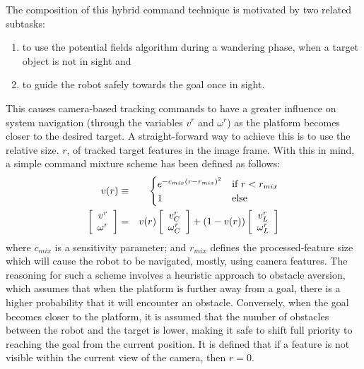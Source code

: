 			The composition of this hybrid command technique is motivated by two related subtasks: 
				\begin{enumerate}
				\item to use the potential fields algorithm during a wandering phase, when a target object is not in sight and
				\item to guide the robot safely towards the goal once in sight.
				\end{enumerate}
			This causes camera-based tracking commands to have a greater influence on system navigation (through the variables $v^{r}$ and $\omega^{r}$) as the platform becomes closer to the desired target. A straight-forward way to achieve this is to use the relative size. $r$, of tracked target features in the image frame. With this in mind, a simple command mixture scheme has been defined as follows:
			\begin{eqnarray}
				v(r) &\equiv&
				\begin{cases}
				e^{ -c_{mix} \left( r - r_{mix}\right)^{2} } 	& \text{if } r < r_{mix}	\\
				1											& \text{else}
				\end{cases}
								\nonumber \\
						\left[\begin{array}{c} v^{r} 	\\ \omega^{r} 		\end{array} \right] &=& 	
				v(r)	\left[\begin{array}{c} v^{r}_{C}\\ \omega^{r}_{C} 	\end{array} \right] + 
				(1-v(r))\left[\begin{array}{c} v^{r}_{L}\\ \omega^{r}_{L} 	\end{array} \right] 
			\end{eqnarray}
			where $c_{mix}$ is a sensitivity parameter; and $r_{mix}$ defines the processed-feature size which will cause the robot to be navigated, mostly, using camera features. The reasoning for such a scheme involves a heuristic approach to obstacle aversion, which assumes that when the platform is further away from a goal, there is a higher probability that it will encounter an obstacle. Conversely, when the goal becomes closer to the platform, it is assumed that the number of obstacles between the robot and the target is lower, making it safe to shift full priority to reaching the goal from the current position. It is defined that if a feature is not visible within the current view of the camera, then $r=0$.


